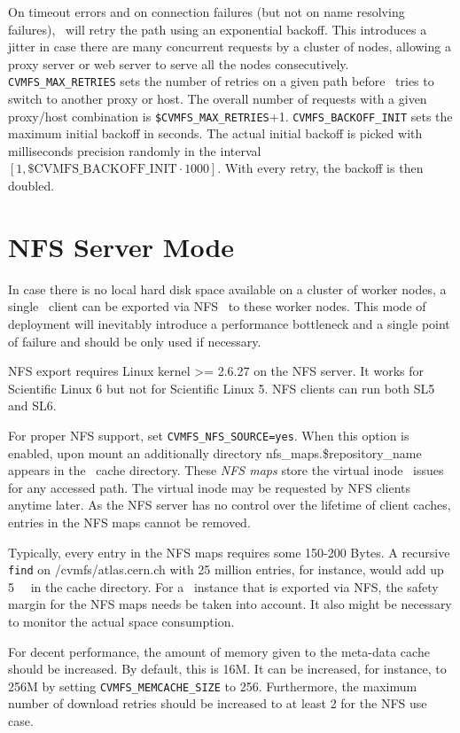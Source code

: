 On timeout errors and on connection failures (but not on name resolving failures), \cvmfs\ will retry the path using an exponential backoff.
This introduces a jitter in case there are many concurrent requests by a cluster of nodes, allowing a proxy server or web server to serve all the nodes consecutively.
\texttt{CVMFS\_MAX\_RETRIES} sets the number of retries on a given path before \cvmfs\ tries to switch to another proxy or host. 
The overall number of requests with a given proxy/host combination is \texttt{\$CVMFS\_MAX\_RETRIES}+1.
\texttt{CVMFS\_BACKOFF\_INIT} sets the maximum initial backoff in seconds.  
The actual initial backoff is picked with milliseconds precision randomly in the interval $[1, \text{\$CVMFS\_BACKOFF\_INIT}\cdot 1000]$.
With every retry, the backoff is then doubled.

\section{NFS Server Mode}
In case there is no local hard disk space available on a cluster of worker nodes, a single \cvmfs\ client can be exported via NFS~\cite{rfc1813,rfc3530} to these worker nodes.
This mode of deployment will inevitably introduce a performance bottleneck and a single point of failure and should be only used if necessary.

NFS export requires Linux kernel >= 2.6.27 on the NFS server. 
It works for Scientific Linux 6 but not for Scientific Linux 5. 
NFS clients can run both SL5 and SL6.

For proper NFS support, set \texttt{CVMFS\_NFS\_SOURCE=yes}. 
When this option is enabled, upon mount an additionally directory nfs\_maps.\$repository\_name appears in the \cvmfs\ cache directory.
These \emph{NFS maps} store the virtual inode \cvmfs\ issues for any accessed path.
The virtual inode may be requested by NFS clients anytime later.
As the NFS server has no control over the lifetime of client caches, entries in the NFS maps cannot be removed.

Typically, every entry in the NFS maps requires some 150-200 Bytes. 
A recursive \texttt{find} on /cvmfs/atlas.cern.ch with 25 million entries, for instance, would add up \SI{5}{\giga\byte} in the cache directory. 
For a \cvmfs\ instance that is exported via NFS, the safety margin for the NFS maps needs be taken into account.
It also might be necessary to monitor the actual space consumption.

For decent performance, the amount of memory given to the meta-data cache should be increased. 
By default, this is 16M.
It can be increased, for instance, to 256M by setting \texttt{CVMFS\_MEMCACHE\_SIZE} to 256.
Furthermore, the maximum number of download retries should be increased to at least 2 for the NFS use case. 


